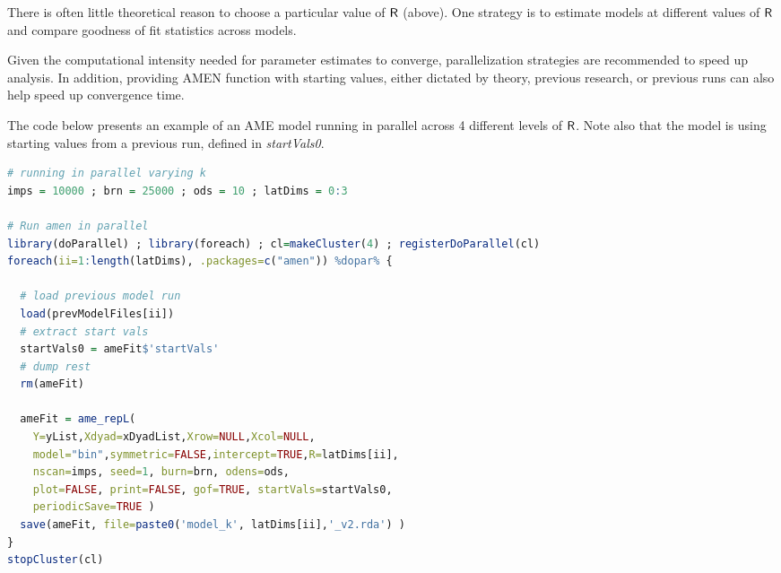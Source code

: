 There is often little theoretical reason to choose a particular value of $\sf{R}$ (above). One strategy is to estimate models at different values of $\sf{R}$ and compare goodness of fit statistics across models. 

Given the computational intensity needed for parameter estimates to converge, parallelization strategies are recommended to speed up analysis. In addition, providing AMEN function with starting values, either dictated by theory, previous research, or previous runs can also help speed up convergence time. 

The code below presents an example of an AME model running in parallel across 4 different levels of $\sf{R}$. Note also that the model is using starting values from a previous run, defined in \textit{startVals0}. 

\begin{lstlisting}[language=R]
# running in parallel varying k
imps = 10000 ; brn = 25000 ; ods = 10 ; latDims = 0:3

# Run amen in parallel
library(doParallel) ; library(foreach) ; cl=makeCluster(4) ; registerDoParallel(cl)
foreach(ii=1:length(latDims), .packages=c("amen")) %dopar% {
  
  # load previous model run
  load(prevModelFiles[ii])
  # extract start vals
  startVals0 = ameFit$'startVals'
  # dump rest
  rm(ameFit)
  
  ameFit = ame_repL(
    Y=yList,Xdyad=xDyadList,Xrow=NULL,Xcol=NULL, 
    model="bin",symmetric=FALSE,intercept=TRUE,R=latDims[ii], 
    nscan=imps, seed=1, burn=brn, odens=ods, 
    plot=FALSE, print=FALSE, gof=TRUE, startVals=startVals0,
    periodicSave=TRUE )     
  save(ameFit, file=paste0('model_k', latDims[ii],'_v2.rda') )
}
stopCluster(cl)
\end{lstlisting}